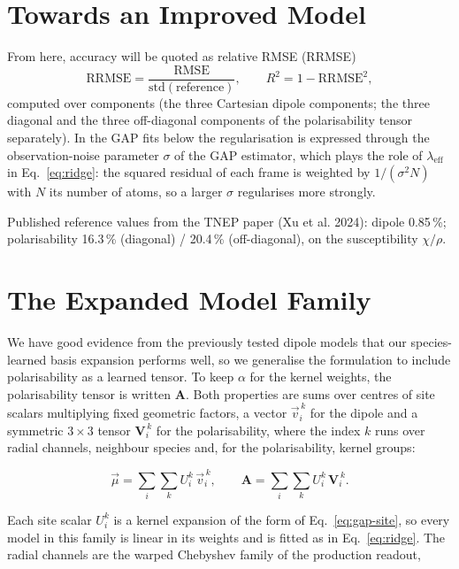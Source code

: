 \documentclass[11pt,a4paper]{article}
\begin{document}
\section{Towards an Improved Model}\label{sec:scope}

From here, accuracy will be quoted as relative RMSE (RRMSE)
\begin{equation}
\mathrm{RRMSE} = \frac{\mathrm{RMSE}}{\mathrm{std}(\mathrm{reference})},\qquad R^2 = 1-\mathrm{RRMSE}^2 ,
\label{eq:rrmse}
\end{equation}
computed over components (the three Cartesian dipole components; the three diagonal and the three
off-diagonal components of the polarisability tensor separately). In the GAP fits below the
regularisation is expressed through the observation-noise parameter $\sigma$ of the GAP
estimator, which plays the role of $\lambda_{\mathrm{eff}}$ in Eq.~\ref{eq:ridge}: the squared
residual of each frame is weighted by $1/(\sigma^2 N)$ with $N$ its number of atoms, so a larger
$\sigma$ regularises more strongly.

Published reference values from the TNEP paper (Xu et al. 2024): dipole 0.85\,\%; polarisability 16.3\,\% (diagonal) / 20.4\,\%
(off-diagonal), on the susceptibility $\chi/\rho$.

\section{The Expanded Model Family}\label{sec:readout}

We have good evidence from the previously tested dipole models that our species-learned basis expansion performs well, so we generalise the formulation to include polarisability as a learned tensor. To keep $\alpha$ for the kernel weights, the polarisability tensor is written $\mathbf{A}$. Both properties are sums over centres of site scalars multiplying fixed geometric factors, a vector $\vec v_i^{\,k}$ for the dipole and a symmetric $3\times3$ tensor $\mathbf{V}_i^{\,k}$ for the polarisability, where the index $k$ runs over radial channels, neighbour species and, for the polarisability, kernel groups:

\begin{equation}
\vec{\mu} = \sum_i \sum_k U^{k}_i\, \vec v_i^{\,k}, \qquad
\mathbf{A} = \sum_i \sum_k U^{k}_i\, \mathbf{V}_i^{\,k} .
\label{eq:readout}
\end{equation}

Each site scalar $U_i^k$ is a kernel expansion of the form of Eq.~\ref{eq:gap-site}, so every model in this family is linear in its weights and is fitted as in Eq.~\ref{eq:ridge}. The radial channels are the warped Chebyshev family of the production readout,
\end{document}
